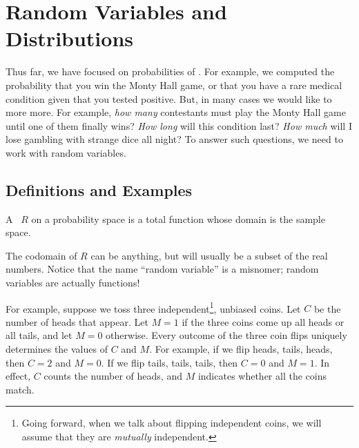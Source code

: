 \chapter{Random Variables and Distributions}\label{ran_var_chap}

Thus far, we have focused on probabilities of .  For
example, we computed the probability that you win the Monty Hall game,
or that you have a rare medical condition given that you tested
positive.  But, in many cases we would like to more more.  For
example, \emph{how many} contestants must play the Monty Hall game
until one of them finally wins?  \emph{How long} will this condition
last?  \emph{How much} will I lose gambling with strange dice all
night?  To answer such questions, we need to work with random
variables.

\section{Definitions and Examples}\label{ran_var_examples_sec}

\begin{definition}
  A ~$R$ on a probability space is a total function
  whose domain is the sample space.
\end{definition}
The codomain of $R$ can be anything, but will usually be a subset of
the real numbers.  Notice that the name ``random variable'' is a
misnomer; random variables are actually functions!

For example, suppose we toss three independent\footnote{Going forward,
  when we talk about flipping independent coins, we will assume that
  they are \emph{mutually} independent.}, unbiased coins.  Let $C$ be the
number of heads that appear.  Let $M = 1$ if the three coins come up
all heads or all tails, and let $M = 0$ otherwise.  Every outcome of
the three coin flips uniquely determines the values of $C$ and $M$.
For example, if we flip heads, tails, heads, then $C = 2$ and $M = 0$.
If we flip tails, tails, tails, then $C = 0$ and $M = 1$.  In effect,
$C$ counts the number of heads, and $M$ indicates whether all the
coins match.

